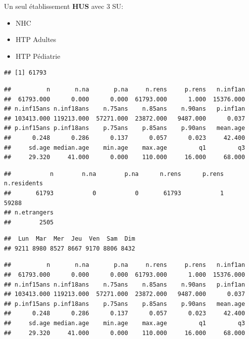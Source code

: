 \documentclass[]{article}
\begin{document}
Un seul établissement \textbf{HUS} avec 3 SU:

\begin{itemize}
\itemsep1pt\parskip0pt
\item
  NHC
\item
  HTP Adultes
\item
  HTP Pédiatrie
\end{itemize}

\begin{verbatim}
## [1] 61793
\end{verbatim}

\begin{verbatim}
##          n       n.na       p.na     n.rens     p.rens   n.inf1an 
##  61793.000      0.000      0.000  61793.000      1.000  15376.000 
## n.inf15ans n.inf18ans    n.75ans    n.85ans    n.90ans   p.inf1an 
## 103413.000 119213.000  57271.000  23872.000   9487.000      0.037 
## p.inf15ans p.inf18ans    p.75ans    p.85ans    p.90ans   mean.age 
##      0.248      0.286      0.137      0.057      0.023     42.400 
##     sd.age median.age    min.age    max.age         q1         q3 
##     29.320     41.000      0.000    110.000     16.000     68.000
\end{verbatim}

\begin{verbatim}
##           n        n.na        p.na      n.rens      p.rens n.residents 
##       61793           0           0       61793           1       59288 
## n.etrangers 
##        2505
\end{verbatim}

\begin{verbatim}
##  Lun  Mar  Mer  Jeu  Ven  Sam  Dim 
## 9211 8980 8527 8667 9170 8806 8432
\end{verbatim}

\begin{verbatim}
##          n       n.na       p.na     n.rens     p.rens   n.inf1an 
##  61793.000      0.000      0.000  61793.000      1.000  15376.000 
## n.inf15ans n.inf18ans    n.75ans    n.85ans    n.90ans   p.inf1an 
## 103413.000 119213.000  57271.000  23872.000   9487.000      0.037 
## p.inf15ans p.inf18ans    p.75ans    p.85ans    p.90ans   mean.age 
##      0.248      0.286      0.137      0.057      0.023     42.400 
##     sd.age median.age    min.age    max.age         q1         q3 
##     29.320     41.000      0.000    110.000     16.000     68.000
\end{verbatim}
\end{document}
